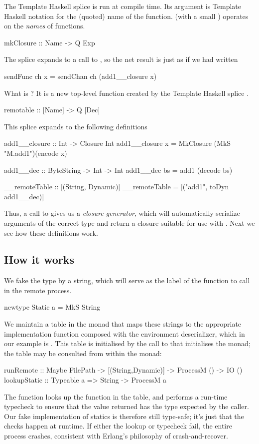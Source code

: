 \documentclass{sigplanconf}
\begin{document}
The Template Haskell splice 
is run at compile time.  Its argument  is Template Haskell notation
for the (quoted) name of the  function.  
 (with a small ) operates on the \emph{names} of functions.
\begin{code}
  mkClosure :: Name -> Q Exp
\end{code}
The splice expands to a call to , 
so the net result is just as if we had written
\begin{code}
  sendFunc ch x = sendChan ch (add1__closure x)
\end{code}
What is ?  It is a new top-level function
created by the Template Haskell splice .
\begin{code}
  remotable :: [Name] -> Q [Dec]
\end{code}
This splice expands to the following definitions
\begin{code}
add1__closure :: Int -> Closure Int
add1__closure x = MkClosure (MkS "M.add1")(encode x)

add1__dec :: ByteString -> Int -> Int
add1__dec bs = add1 (decode bs)

__remoteTable :: [(String, Dynamic)]
__remoteTable = [("add1", toDyn add1__dec)]
\end{code}
Thus, a call to  gives us a \emph{closure generator}, which will automatically serialize arguments of the correct type and return a closure suitable for use with . Next we see how these definitions work.

\subsection{How it works}

We fake the  type by a string, which will serve as the 
label of the function to call in the remote process.
\begin{code}
  newtype Static a = MkS String
\end{code}
We maintain a table in the  monad that maps these strings
to the appropriate implementation function composed with the environment deserializer, which in our example is
.
This table is initialised by the call to  that initialises the
 monad; the table may be consulted from within the monad:
\begin{code}
runRemote :: Maybe FilePath -> [(String,Dynamic)]
                       -> ProcessM () -> IO ()
lookupStatic :: Typeable a => String -> ProcessM a
\end{code}
The  function looks up the function in the table,
and performs a run-time typecheck to ensure that the value returned
has the type expected by the caller.  Our fake implementation of
statics is therefore still type-safe; it's just that the checks happen
at runtime.  If either the lookup or typecheck fail, the entire 
process crashes, consistent with Erlang's philosophy of crash-and-recover.
\end{document}
